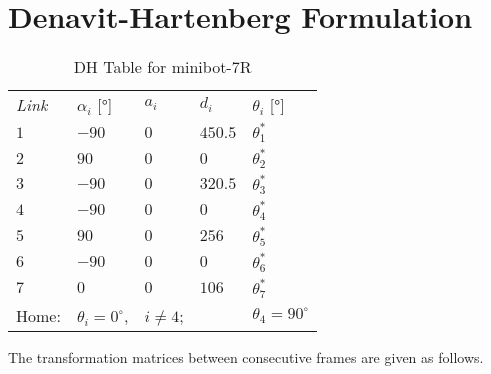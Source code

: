 \section{Denavit-Hartenberg Formulation}
\label{sec:dh}

{\renewcommand{\arraystretch}{1.2}
\begin{table}[t]
    \caption{DH Table for minibot-7R}
    \label{tab:dh}
    \centering
    \begin{tabular}{ *5l }           \toprule
      \emph{Link}  & \emph{$\alpha_i$} [\unit{\degree}]& \emph{$a_i$} & \emph{$d_i$}\; [\unit{\milli\meter}] & \emph{$\theta_i$} [\unit{\degree}]\\ 
      \cmidrule(lr){1-1} \cmidrule(lr){2-2} \cmidrule(lr){3-3} \cmidrule(lr){4-4} \cmidrule(lr){5-5}
      $1$ & $-90$ & $0$ & $450.5$ & $\theta_1^*$ \\
    $2$ & $90$ & $0$ & $0$ & $\theta_2^*$ \\
    $3$ & $-90$ & $0$  & $320.5$ & $\theta_3^*$ \\
    $4$ & $-90$ & $0$ & $0$ & $\theta_4^*$ \\
    $5$ & $90$ & $0$ & $256$ & $\theta_5^*$ \\
    $6$ & $-90$ & $0$ & $0$ & $\theta_6^*$ \\
    $7$ & $0$ & $0$ & $106$ & $\theta_7^*$ \\ \midrule
    Home: & $\theta_i = 0^\circ$, & $i \neq 4$; & & $\theta_4 = 90^\circ$ \\
    \bottomrule
    \hline
    \end{tabular}
\end{table}
}

The transformation matrices between consecutive frames are given as follows.

